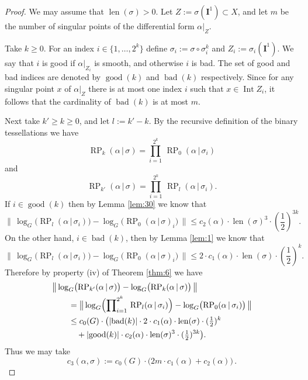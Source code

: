 \documentclass[10pt, a4paper]{amsart}
\theoremstyle{definition}
\numberwithin{equation}{section}
\newcommand{\opn}{\operatorname}
\newcommand{\mbf}[1]{\mathbf{#1}}
\newcommand{\smfrac}[2]{{\textstyle \frac{#1}{#2}}}
\newcommand{\boprod}{\prod\nolimits}
\newcommand{\Norm}[1]{\bigl\lVert\, #1 \, \bigr\rVert}
\newcommand{\abs}[1]{\lvert #1 \rvert}
\renewcommand{\vert}{\, | \,}
\begin{document}
\begin{proof}
We may assume that $\opn{len}(\sigma) > 0$. 
Let $Z := \sigma(\mbf{I}^{1}) \subset X$, and let $m$ be the number of singular
points of the differential form $\alpha|_Z$. 

Take $k \geq 0$. For an index $i \in \{ 1, \ldots, 2^k \}$ define
$\sigma_i := \sigma \circ \sigma^k_i$
and $Z_i := \sigma_i(\mbf{I}^{1})$. We say that $i$ is good if 
$\alpha|_{Z_i}$ is smooth, and otherwise $i$ is bad. The set of good and
bad indices are denoted by $\opn{good}(k)$ and $\opn{bad}(k)$ respectively.
Since for any singular point $x$ of $\alpha|_Z$ there is at most one index $i$
such that $x \in \opn{Int} Z_i$, 
it follows that the cardinality of $\opn{bad}(k)$ is at most $m$. 

Next take $k' \geq k \geq 0$, and let $l := k' - k$. 
By the recursive definition of the binary tessellations we have
\[ \opn{RP}_{k}(\alpha \vert \sigma) =
\prod_{i = 1}^{2^k} \,  \opn{RP}_{0}(\alpha \vert \sigma_i)  \]
and
\[ \opn{RP}_{k'}(\alpha \vert \sigma) =
\prod_{i = 1}^{2^k} \,  \opn{RP}_{l}(\alpha \vert \sigma_i) . \]
If $i \in \opn{good}(k)$ then by Lemma \ref{lem:30} we know that 
\[ \Norm{ 
\opn{log}_G \bigl( \opn{RP}_{l}(\alpha \vert \sigma_i) \bigr) -
\opn{log}_G \bigl( \opn{RP}_{0}(\alpha \vert \sigma)_i \bigr) }
\leq c_2(\alpha) \cdot \opn{len}(\sigma)^3 \cdot (\smfrac{1}{2})^{3 k} . \]
On the other hand, $i \in \opn{bad}(k)$, then by Lemma \ref{lem:1} we know
that 
\[ \Norm{ 
\opn{log}_G \bigl( \opn{RP}_{l}(\alpha \vert \sigma_i) \bigr) -
\opn{log}_G \bigl( \opn{RP}_{0}(\alpha \vert \sigma)_i \bigr) }
\leq 
2 \cdot c_1(\alpha) \cdot \opn{len}(\sigma) \cdot (\smfrac{1}{2})^{k} . \]
Therefore by property (iv) of Theorem \ref{thm:6} we have
\[ \begin{aligned}
& \Norm{ 
\opn{log}_G \bigl( \opn{RP}_{k'}(\alpha \vert \sigma) \bigr) -
\opn{log}_G \bigl( \opn{RP}_{k}(\alpha \vert \sigma) \bigr) } \\
& \qquad = \Norm{ \opn{log}_G \Bigl( \boprod_{i = 1}^{2^k} \,
\opn{RP}_{l}(\alpha \vert \sigma_i) \Bigr) -
\opn{log}_G \bigl( \opn{RP}_{0}(\alpha \vert \sigma_i) \bigr) } \\
& \qquad \leq
c_0(G) \cdot \bigl( 
\abs{ \opn{bad}(k) } \cdot 2 \cdot c_1(\alpha) \cdot \opn{len}(\sigma) 
 \cdot (\smfrac{1}{2})^{k} \\
& \qquad \quad +
\abs{ \opn{good}(k) } \cdot
c_2(\alpha) \cdot \opn{len}(\sigma)^3 \cdot (\smfrac{1}{2})^{3 k}
\bigr) . 
\end{aligned} \]
Thus we may take
\[ c_3(\alpha, \sigma) := c_0(G) \cdot \bigl( 2 m \cdot c_1(\alpha) +
c_2(\alpha) \bigr) \, . \]
\end{proof}
\end{document}
